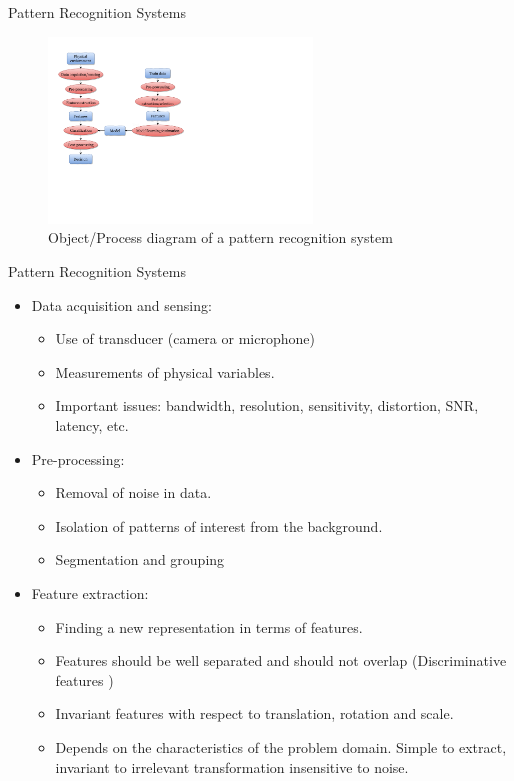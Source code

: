 \begin{frame}{Pattern Recognition Systems}
\begin{figure}
\includegraphics[width=7cm]{Figures/PRsystem2}
\caption{Object/Process diagram of a pattern recognition system}
\end{figure}
\end{frame}

\begin{frame}{Pattern Recognition Systems}
\begin{itemize}
\setlength{\itemsep}{6pt}
\item {\color{mycolor2}Data acquisition and sensing:}
\begin{itemize}
\item Use of transducer (camera or microphone)
\item Measurements of physical variables.
\item Important issues: bandwidth, resolution, sensitivity,
distortion, SNR, latency, etc.
\end{itemize}
\item {\color{mycolor2}Pre-processing:}
\begin{itemize}
\item  Removal of noise in data.
\item Isolation of patterns of interest from the background.
\item Segmentation and grouping
\end{itemize}
\item {\color{mycolor2}Feature extraction:}
\begin{itemize}
\item Finding a new representation in terms of features.
\item Features should be well separated and should not overlap (Discriminative features )
\item Invariant features with respect to translation, rotation and scale.
\item Depends on the characteristics of the problem domain. Simple to extract, invariant to irrelevant transformation insensitive to noise.
\end{itemize} 
\end{itemize}
\end{frame}

